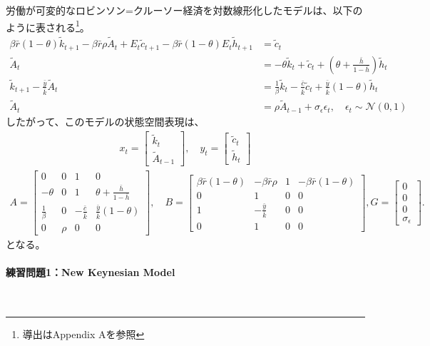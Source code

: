 \documentclass[a4j, dvipdfmx]{jarticle}
\begin{document}
労働が可変的なロビンソン=クルーソー経済を対数線形化したモデルは、以下のように表される\footnote{導出はAppendix Aを参照}。
\begin{align}
\beta\bar r (1-\theta)\tilde k_{t+1} -\beta\bar r\rho\tilde A_t + E_t\tilde c_{t+1}-\beta\bar r (1-\theta)E_t\tilde h_{t+1} &= \tilde c_t \label{euler2}\\
\tilde A_t & =  - \theta\tilde k_t + \tilde c_t + \left(\theta+ \frac{\bar h}{1-\bar h}\right)\tilde h_t \\
\tilde k_{t+1} - \frac{\bar y}{\bar k} \tilde A_t &= \frac{1}{\beta}\tilde k_t - \frac{\bar c}{\bar k} \tilde c_t + \frac{\bar y}{\bar k} (1-\theta) \tilde h_t\\
\tilde A_t &= \rho \tilde A_{t-1} + \sigma_{\epsilon} \epsilon_t, \quad \epsilon_t \sim \mathcal N(0,1)
\end{align}
したがって、このモデルの状態空間表現は、
\begin{align}
x_t = \begin{bmatrix}\tilde k_t \\ \tilde A_{t-1}\end{bmatrix}, \quad y_t = \begin{bmatrix}\tilde c_t \\ \tilde h_t\end{bmatrix}
\end{align}
\begin{align}
A = \begin{bmatrix}0 & 0 & 1 & 0 \\ -\theta & 0 & 1 & \theta+\frac{\bar h}{1-\bar h} \\ \frac{1}{\beta} & 0 & -\frac{\bar c}{\bar k} & \frac{\bar y}{\bar k}(1-\theta) \\ 0 & \rho & 0 & 0\end{bmatrix}, \quad B=\begin{bmatrix}\beta \bar r (1-\theta) & -\beta \bar r \rho & 1 & -\beta \bar r (1-\theta) \\ 0 & 1 & 0 & 0 \\ 1 & -\frac{\bar y}{\bar k} & 0 & 0 \\ 0 & 1 & 0 & 0\end{bmatrix}, G=\begin{bmatrix}0 \\ 0 \\ 0 \\ \sigma_{\epsilon}\end{bmatrix}.
\end{align}
となる。

\paragraph{練習問題1：New Keynesian Model}~
\end{document}
